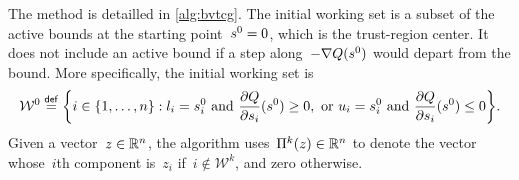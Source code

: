 The method is detailled in \cref{alg:bvtcg}.
The initial working set is a subset of the active bounds at the starting point~$\sstep[0] = 0$, which is the trust-region center.
It does not include an active bound if a step along~$-\nabla Q(\sstep[0])$ would depart from the bound.
More specifically, the initial working set is
\begin{equation}
    \label{eq:bounds-initial-working-set}
    \mathcal{W}^0 \eqdef \set[\bigg]{i \in \set{1, \dots, n} : \xl_i = \sstep[0]_i ~ \text{and} ~ \frac{\partial Q}{\partial \sstep_i}(\sstep[0]) \ge 0, ~ \text{or} ~ \xu_i = \sstep[0]_i ~ \text{and} ~ \frac{\partial Q}{\partial \sstep_i}(\sstep[0]) \le 0}.
\end{equation}
Given a vector~$z \in \mathbb{R}^n$, the algorithm uses~$\Pi^k(z) \in \mathbb{R}^n$ to denote the vector whose~$i$th component is~$z_i$ if~$i \notin \mathcal{W}^k$, and zero otherwise.

